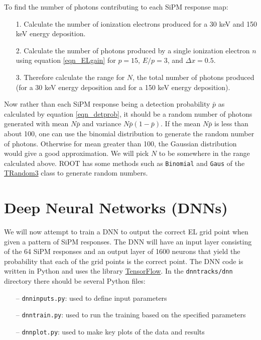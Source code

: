 \documentclass[10pt]{article}
\begin{document}
\noindent To find the number of photons contributing to each SiPM response map:

\begin{enumerate}
	\item[1.] Calculate the number of ionization electrons produced for a 30 keV and 150 keV energy deposition.
	\item[2.] Calculate the number of photons produced by a single ionization electron $n$ using equation \ref{eqn_ELgain} for $p = 15$, $E/p = 3$, and $\Delta x = 0.5$.
	\item[3.] Therefore calculate the range for $N$, the total number of photons produced (for a 30 keV energy deposition and for a 150 keV energy deposition).
\end{enumerate}

\noindent Now rather than each SiPM response being a detection probability $\bar{p}$ as calculated by equation \ref{eqn_detprob}, it should be a random number of photons 
generated with mean $N\bar{p}$ and variance $N\bar{p}(1-\bar{p})$.  If the mean $N\bar{p}$ is less than about 100, one can use the 
binomial distribution to generate the random number of photons.  Otherwise for mean greater than 100, the Gaussian distribution would give a good approximation.  We will pick $N$ to
be somewhere in the range calculated above.  ROOT has some methods such as \verb|Binomial| and \verb|Gaus| of the
\href{https://root.cern.ch/doc/master/classTRandom3.html}{TRandom3} class to generate random numbers.

\section{Deep Neural Networks (DNNs)}
\noindent We will now attempt to train a DNN to output the correct EL grid point when given a pattern of SiPM responses.  The DNN will have an input layer consisting of the 64 SiPM responses and
an output layer of 1600 neurons that yield the probability that each of the grid points is the correct point.  The DNN code is written in Python and uses the library
\href{https://www.tensorflow.org}{TensorFlow}.  In the \verb|dnntracks/dnn| directory there should be several Python files:

\begin{enumerate}
	\item[--] \verb|dnninputs.py|: used to define input parameters
	\item[--] \verb|dnntrain.py|: used to run the training based on the specified parameters
	\item[--] \verb|dnnplot.py|: used to make key plots of the data and results
\end{enumerate}
\end{document}
